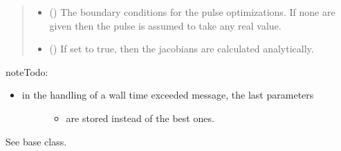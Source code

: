 \documentclass[letterpaper,10pt,english]{sphinxmanual}
\begin{document}
\begin{fulllineitems}
\begin{quote}
\begin{description}
\begin{itemize}
\item {} 
 (\sphinxstyleliteralemphasis{\sphinxupquote{, }}) \textendash{} The boundary conditions for the pulse optimizations. If none are given
then the pulse is assumed to take any real value.

\item {} 
 (\sphinxstyleliteralemphasis{\sphinxupquote{, }}) \textendash{} If set to true, then the jacobians are calculated analytically.

\end{itemize}

\end{description}\end{quote}

\begin{sphinxadmonition}{note}{\label{\detokenize{qsim:id28}}Todo:}\begin{itemize}
\item {} \begin{description}
\item[{in the handling of a wall time exceeded message, the last parameters}] \leavevmode\begin{itemize}
\item {} 
are stored instead of the best ones.

\end{itemize}

\end{description}

\end{itemize}
\end{sphinxadmonition}

\begin{fulllineitems}
\label{\detokenize{qsim:qsim.optimize.LeastSquaresOptimizer.run_optimization}}
See base class.

\end{fulllineitems}


\end{fulllineitems}
\end{document}
